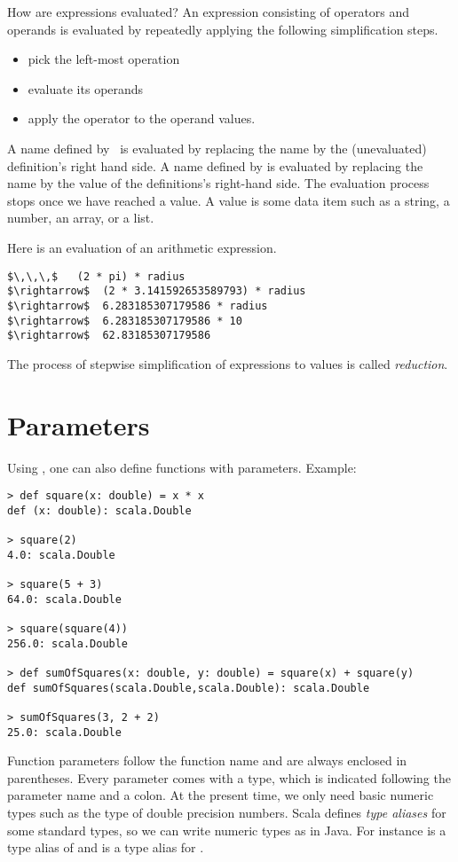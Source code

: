How are expressions evaluated? An expression consisting of operators
and operands is evaluated by repeatedly applying the following
simplification steps.
\begin{itemize}
\item pick the left-most operation
\item evaluate its operands
\item apply the operator to the operand values.
\end{itemize}
A name defined by \ is evaluated by replacing the name by the
(unevaluated) definition's right hand side. A name defined by  is
evaluated by replacing the name by the value of the definitions's
right-hand side.  The evaluation process stops once we have reached a
value. A value is some data item such as a string, a number, an array,
or a list.

\example
Here is an evaluation of an arithmetic expression.
\begin{lstlisting}
$\,\,\,$   (2 * pi) * radius
$\rightarrow$  (2 * 3.141592653589793) * radius
$\rightarrow$  6.283185307179586 * radius
$\rightarrow$  6.283185307179586 * 10
$\rightarrow$  62.83185307179586
\end{lstlisting}
The process of stepwise simplification of expressions to values is
called {\em reduction}.

\section{Parameters}

Using , one can also define functions with parameters. Example:
\begin{lstlisting}
> def square(x: double) = x * x
def (x: double): scala.Double

> square(2)
4.0: scala.Double

> square(5 + 3)
64.0: scala.Double

> square(square(4))
256.0: scala.Double

> def sumOfSquares(x: double, y: double) = square(x) + square(y)
def sumOfSquares(scala.Double,scala.Double): scala.Double

> sumOfSquares(3, 2 + 2)
25.0: scala.Double
\end{lstlisting}

Function parameters follow the function name and are always enclosed
in parentheses.  Every parameter comes with a type, which is indicated
following the parameter name and a colon.  At the present time, we
only need basic numeric types such as the type  of
double precision numbers. Scala defines {\em type aliases} for some
standard types, so we can write numeric types as in Java. For instance
 is a type alias of  and  is
a type alias for .

